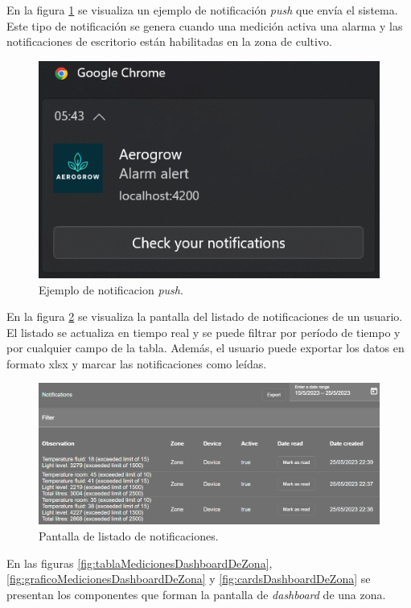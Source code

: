 En la figura \ref{fig:notificacionPushEmail} se visualiza un ejemplo de notificación \emph{push} que envía el sistema. Este tipo de notificación se genera cuando una medición activa una alarma y las notificaciones de escritorio están habilitadas en la zona de cultivo.

\begin{figure}[H]
	\centering
	\includegraphics[width=.6\textwidth]{./Figures/Notificacion push.png}
	\caption{Ejemplo de notificacion \emph{push}.}
	\label{fig:notificacionPushEmail}
\end{figure}

En la figura \ref{fig:listaDeNotificaciones} se visualiza la pantalla del listado de notificaciones de un usuario. El listado se actualiza en tiempo real y se puede filtrar por período de tiempo y por cualquier campo de la tabla. Además, el usuario puede exportar los datos en formato xlsx y marcar las notificaciones como leídas.

\begin{figure}[H]
	\centering
	\includegraphics[width=.9\textwidth]{./Figures/Frontend lista de notificaciones.png}
	\caption{Pantalla de listado de notificaciones.}
	\label{fig:listaDeNotificaciones}
\end{figure}

En las figuras \ref{fig:tablaMedicionesDashboardDeZona}, \ref{fig:graficoMedicionesDashboardDeZona} y \ref{fig:cardsDashboardDeZona} se presentan los componentes que forman la pantalla de \emph{dashboard} de una zona. 

